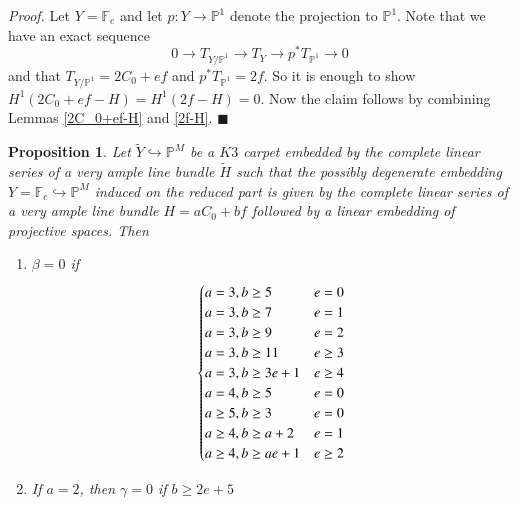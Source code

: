 \documentclass[11pt,twoside]{amsart}
\theoremstyle{plain}
\numberwithin{equation}{section}
\newtheorem{proposition}[theorem]{Proposition}
\theoremstyle{definition}
\newcommand*{\QEDA}{\hfill\ensuremath{\blacksquare}}
\begin{document}
\noindent\textit{Proof.} Let $Y = \mathbb{F}_e$ and let $p: Y \to \mathbb{P}^1$ denote the projection to $\mathbb{P}^1$. Note that we have an exact sequence 
$$0 \to T_{Y/\mathbb{P}^1} \to T_Y \to p^*T_{\mathbb{P}^1} \to 0$$
and that $T_{Y/\mathbb{P}^1} = 2C_0+ef$ and $p^*T_{\mathbb{P}^1} = 2f$. So it is enough to show $H^1(2C_0+ef-H) = H^1(2f-H) = 0$. Now the claim follows by combining Lemmas \ref{2C_0+ef-H} and \ref{2f-H}. \QEDA



\begin{proposition}\label{calculating beta}
Let $\widetilde{Y} \hookrightarrow \mathbb{P}^M$ be a $K3$ carpet embedded by the complete linear series of a very ample line bundle $\widetilde{H}$ such that the possibly degenerate embedding $Y = \mathbb{F}_e \hookrightarrow \mathbb{P}^M$ induced on the reduced part is given by the complete linear series of a very ample line bundle $H = aC_0+bf$ followed by a linear embedding of projective spaces.   
Then 

\begin{enumerate}
    \item $\beta = 0$ if
    \[
\begin{cases}
    a = 3, b \geq 5 & e = 0  \\
    a = 3, b \geq 7 & e = 1  \\
    a = 3, b \geq 9 & e = 2  \\
\color{black}
    a = 3, b \geq 11 & e \geq 3 \\
    a = 3, b \geq 3e+1 & e \geq 4 \\
\color{black}
    a = 4, b \geq 5 & e = 0 \\
    a \geq 5, b \geq 3 & e = 0 \\
    a \geq 4, b \geq a+2 & e = 1 \\
    a \geq 4, b \geq ae+1 & e \geq 2 \\
    
\end{cases}
  \]

  \item If $a = 2$, then $\gamma = 0$ if $b \geq 2e+5$



\end{enumerate}
  

 


\end{proposition}
 
\end{document}
